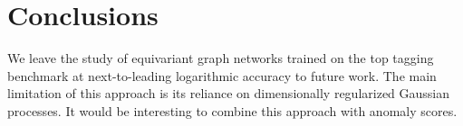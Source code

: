 \section{Conclusions}\label{sec:conclusions}

We leave the study of equivariant graph networks trained on the top
tagging benchmark at next-to-leading logarithmic accuracy to future
work. The main limitation of this approach is its reliance on
dimensionally regularized Gaussian processes. It would be interesting to
combine this approach with anomaly scores.

